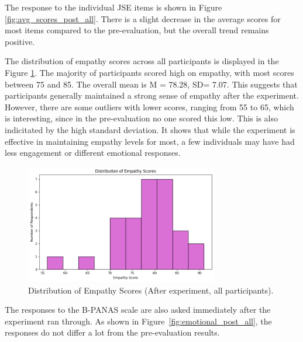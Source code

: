  The response to the individual JSE items is shown in Figure \ref{fig:avg_scores_post_all}. There is a slight decrease in the average scores for most items compared to the pre-evaluation, but the overall trend remains positive. 

\vspace{1em}

The distribution of empathy scores across all participants is displayed in the Figure \ref{fig:empathy_scores_post_all}. The majority of participants scored high on empathy, with most scores between 75 and 85. The overall mean is M = 78.28, SD= 7.07. This suggests that participants generally maintained a strong sense of empathy after the experiment. However, there are some outliers with lower scores, ranging from 55 to 65, which is interesting, since in the pre-evaluation no one scored this low. This is also indicitated by the high standard deviation. It shows that while the experiment is effective in maintaining empathy levels for most, a few individuals may have had less engagement or different emotional responses.

\begin{figure}[H]
\centering
\includegraphics[width=0.75\textwidth]{../../Figures/empathy_scores_post_all.png}
\caption{Distribution of Empathy Scores (After experiment, all participants).}
\label{fig:empathy_scores_post_all}
\end{figure}

\vspace{1em}

The responses to the B-PANAS scale are also asked immediately after the experiment ran through. As shown in Figure~\ref{fig:emotional_post_all}, the responses do not differ a lot from the pre-evaluation results. 


